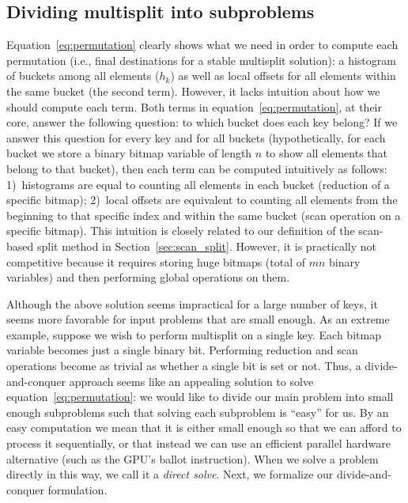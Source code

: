 \subsection{Dividing multisplit into subproblems}\label{subsec:2levels}
Equation~\eqref{eq:permutation} clearly shows what we need in order to compute each permutation (i.e., final destinations for a stable multisplit solution): a histogram of buckets among all elements ($h_k$) as well as local offsets for all elements within the same bucket (the second term). However, it lacks intuition about how we should compute each term.
Both terms in equation~\eqref{eq:permutation}, at their core, answer the following question: to which bucket does each key belong? If we answer this question for every key and for all buckets (hypothetically, for each bucket we store a binary bitmap variable of length $n$ to show all elements that belong to that bucket), then each term can be computed intuitively as follows: 1)~histograms are equal to counting all elements in each bucket (reduction of a specific bitmap); 2)~local offsets are equivalent to counting all elements from the beginning to that specific index and within the same bucket (scan operation on a specific bitmap).
This intuition is closely related to our definition of the scan-based split method in Section~\ref{sec:scan_split}. However, it is practically not competitive because it requires storing huge bitmaps (total of $mn$ binary variables) and then performing global operations on them.

Although the above solution seems impractical for a large number of keys, it seems more favorable for input problems that are small enough.
As an extreme example, suppose we wish to perform multisplit on a single key. Each bitmap variable becomes just a single binary bit. Performing reduction and scan operations become as trivial as whether a single bit is set or not.
Thus, a divide-and-conquer approach seems like an appealing solution to solve equation~\eqref{eq:permutation}: we would like to divide our main problem into small enough subproblems such that solving each subproblem is ``easy'' for us. By an easy computation we mean that it is either small enough so that we can afford to process it sequentially, or that instead we can use an efficient parallel hardware alternative (such as the GPU's ballot instruction). When we solve a problem directly in this way, we call it a \emph{direct solve}.
Next, we formalize our divide-and-conquer formulation.

